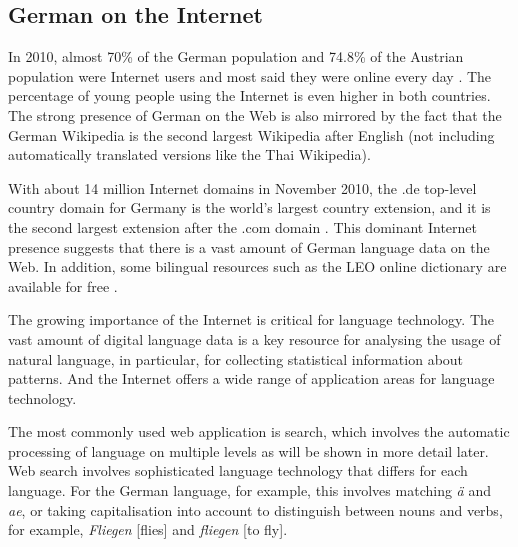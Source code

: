 \begin{multicols}{2}
\subsection{German on the Internet}

In 2010, almost 70\% of the German population and 74.8\% of the Austrian population were Internet users and most said they were online every day  \cite{ard1,ict1}. The percentage of young people using the Internet is even higher in both countries. The strong presence of German on the Web is also mirrored by the fact that the German Wikipedia is the second largest Wikipedia after English (not including automatically translated versions like the Thai Wikipedia).


With about 14 million Internet domains in November 2010, the .de top-level country domain for Germany is the world’s largest country extension, and it is the second largest extension after the .com domain \cite{denic1,ebrands1}. This dominant Internet presence suggests that there is a vast amount of German language data on the Web. In addition, some bilingual resources such as the LEO online dictionary are available for free \cite{leo1}.


The growing importance of the Internet is critical for language technology. The vast amount of digital language data is a key resource for analysing the usage of natural language, in particular, for collecting statistical information about patterns. And the Internet offers a wide range of application areas for language technology. 

The most commonly used web application is search, which involves the automatic processing of language on multiple levels as will be shown in more detail later. Web search involves sophisticated language technology that differs for each language. For the German language, for example, this involves matching \textit{ä} and \textit{ae}, or taking capitalisation into account to distinguish between nouns and verbs, for example, \textit{Fliegen} [flies] and \textit{fliegen} [to fly]. 


\end{multicols}
